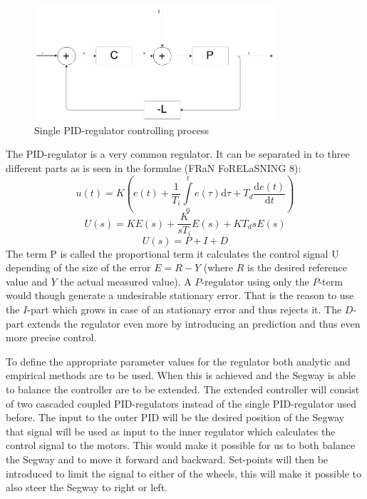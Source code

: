\begin{figure}[h]
    \label{1}
    \centering
    \includegraphics[width=0.8\textwidth]{process_one_regul.png}
    \caption{Single PID-regulator controlling process}
\end{figure}
The PID-regulator is a very common regulator. It can be separated in to three different parts as is seen in the formulae (FRaN FoRELaSNING 8):
\begin{equation}
   u(t) = K(e(t) + \frac{1}{T_i}\int\limits_0^t e(\tau) \mathrm{d}\tau + T_d\frac{\mathrm d e(t)}{\mathrm d t})
\end{equation}
\begin{equation}
   U(s) = KE(s) +  \frac{K}{sT_i}E(s) + KT_d s E(s)
\end{equation}
\begin{equation}
   U(s) = P +  I + D
\end{equation}
The term P is called the proportional term it calculates the control signal U depending of the size of the error $E = R - Y$ (where $R$ is the desired reference value and $Y$ the actual measured value). A $P$-regulator using only the $P$-term would though generate a undesirable stationary error. That is the reason to use the $I$-part which grows in case of an stationary error and thus rejects it. The $D$-part extends the regulator even more by introducing an prediction and thus even more precise control.

To define the appropriate parameter values for the regulator both analytic and empirical methods are to be used.
 When this is achieved and the Segway is able to balance the controller are to be extended. The extended controller will consist of  two cascaded coupled PID-regulators instead of the single PID-regulator used before. The input to the outer PID will be the desired position of the Segway that signal will be used as input to the inner regulator which calculates the control signal to the motors. This would make it possible for us to both balance the Segway and to move it forward and backward. Set-points will then be introduced to limit the signal to either of the wheels, this will make it possible to also steer the Segway to right or left.



